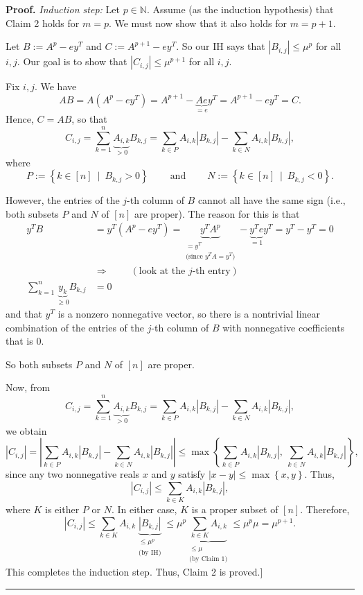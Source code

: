 \documentclass[numbers=enddot,12pt,final,onecolumn,notitlepage]{scrartcl}%
\numberwithin{exer}{subsection}
\theoremstyle{definition}
\newenvironment{proof}[1][Proof]{\noindent\textbf{#1.} }{\ \rule{0.5em}{0.5em}}
\let\sumnonlimits\sum
\renewcommand{\sum}{\sumnonlimits\limits}
\begin{document}
\begin{proof}
\textit{Induction step:} Let $p\in\mathbb{N}$. Assume (as the induction
hypothesis) that Claim 2 holds for $m=p$. We must now show that it also holds
for $m=p+1$.

Let $B:=A^{p}-ey^{T}$ and $C:=A^{p+1}-ey^{T}$. So our IH says that $\left\vert
B_{i,j}\right\vert \leq\mu^{p}$ for all $i,j$. Our goal is to show that
$\left\vert C_{i,j}\right\vert \leq\mu^{p+1}$ for all $i,j$.

Fix $i,j$. We have%
\[
AB=A\left(  A^{p}-ey^{T}\right)  =A^{p+1}-\underbrace{Ae}_{=e}y^{T}%
=A^{p+1}-ey^{T}=C.
\]
Hence, $C=AB$, so that%
\[
C_{i,j}=\sum_{k=1}^{n}\underbrace{A_{i,k}}_{>0}B_{k,j}=\sum_{k\in P}%
A_{i,k}\left\vert B_{k,j}\right\vert -\sum_{k\in N}A_{i,k}\left\vert
B_{k,j}\right\vert ,
\]
where%
\[
P:=\left\{  k\in\left[  n\right]  \ \mid\ B_{k,j}>0\right\}
\ \ \ \ \ \ \ \ \ \ \text{and}\ \ \ \ \ \ \ \ \ \ N:=\left\{  k\in\left[
n\right]  \ \mid\ B_{k,j}<0\right\}  .
\]


However, the entries of the $j$-th column of $B$ cannot all have the same sign
(i.e., both subsets $P$ and $N$ of $\left[  n\right]  $ are proper). The
reason for this is that%
\begin{align*}
y^{T}B  & =y^{T}\left(  A^{p}-ey^{T}\right)  =\underbrace{y^{T}A^{p}%
}_{\substack{=y^{T}\\\text{(since }y^{T}A=y^{T}\text{)}}}-\underbrace{y^{T}%
e}_{=1}y^{T}=y^{T}-y^{T}=0\\
& \Longrightarrow\ \ \ \ \ \ \ \ \ \ \left(  \text{look at the }j\text{-th
entry}\right)  \\
\sum_{k=1}^{n}\underbrace{y_{k}}_{\geq0}B_{k,j}  & =0
\end{align*}
and that $y^{T}$ is a nonzero nonnegative vector, so there is a nontrivial
linear combination of the entries of the $j$-th column of $B$ with nonnegative
coefficients that is $0$.

So both subsets $P$ and $N$ of $\left[  n\right]  $ are proper.

Now, from%
\[
C_{i,j}=\sum_{k=1}^{n}\underbrace{A_{i,k}}_{>0}B_{k,j}=\sum_{k\in P}%
A_{i,k}\left\vert B_{k,j}\right\vert -\sum_{k\in N}A_{i,k}\left\vert
B_{k,j}\right\vert ,
\]
we obtain%
\[
\left\vert C_{i,j}\right\vert =\left\vert \sum_{k\in P}A_{i,k}\left\vert
B_{k,j}\right\vert -\sum_{k\in N}A_{i,k}\left\vert B_{k,j}\right\vert
\right\vert \leq\max\left\{  \sum_{k\in P}A_{i,k}\left\vert B_{k,j}\right\vert
,\ \sum_{k\in N}A_{i,k}\left\vert B_{k,j}\right\vert \right\}  ,
\]
since any two nonnegative reals $x$ and $y$ satisfy $\left\vert x-y\right\vert
\leq\max\left\{  x,y\right\}  $. Thus,%
\[
\left\vert C_{i,j}\right\vert \leq\sum_{k\in K}A_{i,k}\left\vert
B_{k,j}\right\vert ,
\]
where $K$ is either $P$ or $N$. In either case, $K$ is a proper subset of
$\left[  n\right]  $. Therefore,%
\[
\left\vert C_{i,j}\right\vert \leq\sum_{k\in K}A_{i,k}\underbrace{\left\vert
B_{k,j}\right\vert }_{\substack{\leq\mu^{p}\\\text{(by IH)}}}\leq\mu
^{p}\underbrace{\sum_{k\in K}A_{i,k}}_{\substack{\leq\mu\\\text{(by Claim 1)}%
}}\leq\mu^{p}\mu=\mu^{p+1}.
\]
This completes the induction step. Thus, Claim 2 is proved.]
\end{proof}
\end{document}
